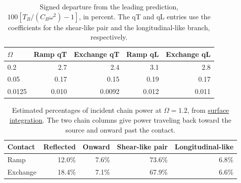 
\begin{table}[htbp]
\centering
\caption{Signed departure from the leading prediction,
$100[T_B/(C_B\omega^2)-1]$, in percent. The qT and qL entries use the coefficients
for the shear-like pair and the longitudinal-like branch, respectively.}
\label{tab:departures}
\begin{tabular}{lrrrr}
\hline
$\Omega$ & Ramp qT & Exchange qT & Ramp qL & Exchange qL\\
\hline
0.2    & 2.7   & 2.4    & 3.1   & 2.8\\
0.05   & 0.17  & 0.15   & 0.19  & 0.17\\
0.0125 & 0.010 & 0.0092 & 0.012 & 0.011\\
\hline
\end{tabular}
\end{table}

\begin{table}[htbp]
\centering
\caption{Estimated percentages of incident chain power at $\Omega=1.2$,
from \href{https://github.com/mike1fernand/low-frequency-radiation-reciprocal-junction-validation/blob/6eac4ca3e89195a6b92445cfd408d9e1a8b1e26c/validation/referee_checks/profile_reversal.json}{surface integration}. The two chain columns give power traveling back
toward the source and onward past the contact.}
\label{tab:partition}
\begin{tabular}{lrrrr}
\hline
Contact & Reflected & Onward & Shear-like pair & Longitudinal-like\\
\hline
Ramp     & 12.0\% & 7.6\% & 73.6\% & 6.8\%\\
Exchange & 18.4\% & 7.1\% & 67.9\% & 6.6\%\\
\hline
\end{tabular}
\end{table}
